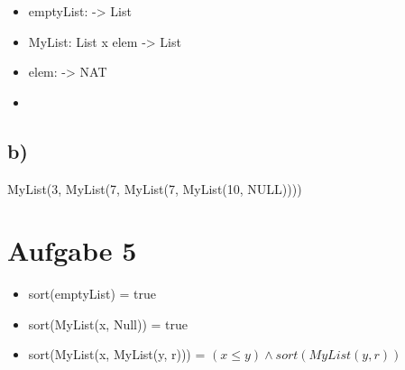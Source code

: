 \documentclass[a4paper,12pt]{article}
\begin{document}
\begin{itemize}
    \item emptyList: -> List
    \item MyList: List x elem -> List
    \item elem: -> NAT
    \item 
\end{itemize}

\subsection*{b)}

MyList(3, MyList(7, MyList(7, MyList(10, NULL))))

\section*{Aufgabe 5}

\begin{itemize}
    \item sort(emptyList) = true
    \item sort(MyList(x, Null)) = true
    \item sort(MyList(x, MyList(y, r))) = $(x \leq y) \land sort(MyList(y, r))$
\end{itemize}
\end{document}
